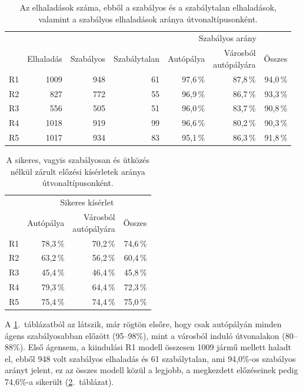 \documentclass[a4paper,12pt,oneside]{article}
\begin{document}
\begin{table}[!htb]
  \centering
  \caption{Az elhaladások száma, ebből a szabályos és a szabálytalan elhaladások, valamint
           a szabályos elhaladások aránya útvonaltípusonként.}
  \label{tab:overtakes}
  \begin{tabular}{lrrrrrr}
    \toprule
    & & & & \multicolumn{3}{c}{Szabályos arány} \\
    \cmidrule(lr){5-7}
    & Elhaladás & Szabályos & Szabálytalan & Autópálya & \shortstack{Városból\\autópályára} & Összes \\
    \midrule
    R1 & 1009 & 948 & 61 & 97,6\,\% & 87,8\,\% & 94,0\,\% \\
    R2 & 827  & 772 & 55 & 96,9\,\% & 86,7\,\% & 93,3\,\% \\
    R3 & 556  & 505 & 51 & 96,0\,\% & 83,7\,\% & 90,8\,\% \\
    R4 & 1018 & 919 & 99 & 96,6\,\% & 80,2\,\% & 90,3\,\% \\
    R5 & 1017 & 934 & 83 & 95,1\,\% & 86,3\,\% & 91,8\,\% \\
    \bottomrule
  \end{tabular}
\end{table}

\begin{table}[!htb]
  \centering
  \caption{A sikeres, vagyis szabályosan és ütközés nélkül zárult előzési kísérletek aránya
           útvonaltípusonként.}
  \label{tab:overtake_success}
  \begin{tabular}{lrrr}
    \toprule
    & \multicolumn{3}{c}{Sikeres kísérlet} \\
    \cmidrule(lr){2-4}
    & Autópálya & \shortstack{Városból\\autópályára} & Összes \\
    \midrule
    R1 & 78,3\,\% & 70,2\,\% & 74,6\,\% \\
    R2 & 63,2\,\% & 56,2\,\% & 60,4\,\% \\
    R3 & 45,4\,\% & 46,4\,\% & 45,8\,\% \\
    R4 & 79,3\,\% & 64,4\,\% & 72,3\,\% \\
    R5 & 75,4\,\% & 74,4\,\% & 75,0\,\% \\
    \bottomrule
  \end{tabular}
\end{table}

A \ref{tab:overtakes}.~táblázatból az látszik, már rögtön elsőre, hogy csak autópályán minden
ágens szabályosabban előzött (95--98\%), mint a városból induló útvonalakon (80--88\%). 
Első ágensem, a kiindulási R1 modell összesen 1009 jármű mellett haladt el,
 ebből 948 volt szabályos elhaladás és
61 szabálytalan, ami 94,0\%-os szabályos arányt jelent, ez az összes modell közül a
legjobb, a megkezdett előzéseinek pedig 74,6\%-a sikerült
(\ref{tab:overtake_success}.~táblázat). 
\end{document}
